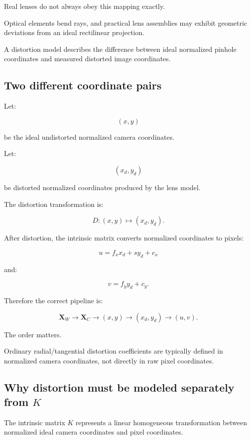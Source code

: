 Real lenses do not always obey this mapping exactly.

Optical elements bend rays, and practical lens assemblies may exhibit geometric deviations from an ideal rectilinear projection.

A distortion model describes the difference between ideal normalized pinhole coordinates and measured distorted image coordinates.

\subsection{Two different coordinate pairs}\label{02-foundations-ii-ch035-two-different-coordinate-pairs}

Let:

\[
 (x,y)
\]

be the ideal undistorted normalized camera coordinates.

Let:

\[
 (x_d,y_d)
\]

be distorted normalized coordinates produced by the lens model.

The distortion transformation is:

\[
 \boxed{ D: (x,y)\mapsto(x_d,y_d) }.
\]

After distortion, the intrinsic matrix converts normalized coordinates to pixels:

\[
 \boxed{ u=f_xx_d+sy_d+c_x }
\]

and:

\[
 \boxed{ v=f_yy_d+c_y }.
\]

Therefore the correct pipeline is:

\[
 \boxed{ \mathbf X_W \rightarrow \mathbf X_C \rightarrow (x,y) \rightarrow (x_d,y_d) \rightarrow (u,v) }.
\]

The order matters.

Ordinary radial/tangential distortion coefficients are typically defined in normalized camera coordinates, not directly in raw pixel coordinates.

\subsection{\texorpdfstring{Why distortion must be modeled separately from \(K\)}{Why distortion must be modeled separately from K}}\label{02-foundations-ii-ch035-why-distortion-must-be-modeled-separately-from-k}

The intrinsic matrix \(K\) represents a linear homogeneous transformation between normalized ideal camera coordinates and pixel coordinates.

